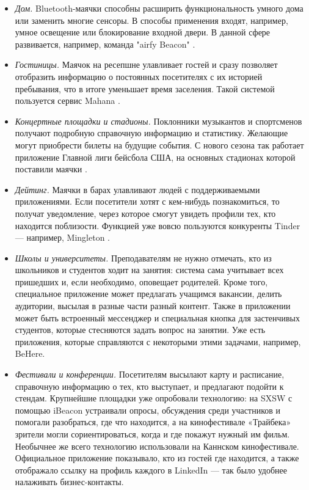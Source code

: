 \begin{itemize}
    \item
    \textit{Дом.} Bluetooth-маячки способны расширить функциональность умного дома или заменить многие сенсоры. В способы применения входят, например, умное освещение или блокирование входной двери. В данной сфере развивается, например, команда "airfy Beacon" \cite{web:airfyBeacon}. 
    \item
    \textit{Гостиницы.} Маячок на ресепшне улавливает гостей и сразу позволяет отобразить информацию о постоянных посетителях с их историей пребывания, что в итоге уменьшает время заселения. Такой системой пользуется сервис Mahana \cite{web:crunchTime}.
    \item
    \textit{Концертные площадки и стадионы.} Поклонники музыкантов и спортсменов получают подробную справочную информацию и статистику. Желающие могут приобрести билеты на будущие события. С нового сезона так работает приложение Главной лиги бейсбола США, на основных стадионах которой поставили маячки \cite{web:MLB}. 
    \item
    \textit{Дейтинг.} Маячки в барах улавливают людей с поддерживаемыми приложениями. Если посетители хотят с кем-нибудь познакомиться, то получат уведомление, через которое смогут увидеть профили тех, кто находится поблизости. Функцией уже вовсю пользуются конкуренты Tinder — например, Mingleton \cite{web:Mingleton}.
    \item
    \textit{Школы и университеты.} Преподавателям не нужно отмечать, кто из школьников и студентов ходит на занятия: система сама учитывает всех пришедших и, если необходимо, оповещает родителей. Кроме того, специальное приложение может предлагать учащимся вакансии, делить аудитории, высылая в разные части разный контент. Также в приложении может быть встроенный мессенджер и специальная кнопка для застенчивых студентов, которые стесняются задать вопрос на занятии. Уже есть приложения, которые справляются с некоторыми этими задачами, например, BeHere.
    \item
    \textit{Фестивали и конференции.} Посетителям высылают карту и расписание, справочную информацию о тех, кто выступает, и предлагают подойти к стендам. Крупнейшие площадки уже опробовали технологию: на SXSW с помощью iBeacon устраивали опросы, обсуждения среди участников и помогали разобраться, где что находится, а на кинофестивале «Трайбека» зрители могли сориентироваться, когда и где покажут нужный им фильм. Необычнее же всего технологию использовали на Каннском кинофестивале. Официальное приложение показывало, кто из гостей где находится, а также отображало ссылку на профиль каждого в LinkedIn — так было удобнее налаживать бизнес-контакты.
\end{itemize}

